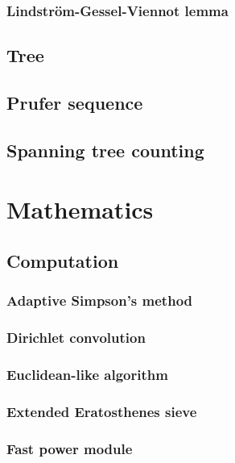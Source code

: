 \documentclass[titlepage,a4paper,10pt]{article}
\begin{document}
\begin{multicols}{2}
\begin{spacing}{0.8}
{				\subsubsection{Lindström-Gessel-Viennot lemma}
					
			\subsection{Tree}
				\subsection{Prufer sequence}
					
				\subsection{Spanning tree counting}
					
		\section{Mathematics}
			\subsection{Computation}
				\subsubsection{Adaptive Simpson's method}
					
				\subsubsection{Dirichlet convolution}
					
				\subsubsection{Euclidean-like algorithm}
					
				\subsubsection{Extended Eratosthenes sieve}
					
				\subsubsection{Fast power module}
					
}
\end{spacing}
\end{multicols}
\end{document}
